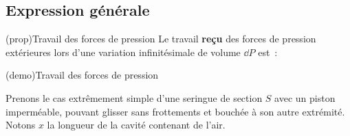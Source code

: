 \documentclass[../../main/main.tex]{subfiles}
\begin{document}
\subsection{Expression générale}

\begin{tcb*}(prop){Travail des forces de pression}
	Le travail \textbf{reçu} des forces de pression extérieures lors d'une
	variation infinitésimale de volume $\dd{P}$ est~:
	\psw{%
		\[
			\boxed{\delta W_p = -P\ind{ext}\dd{V}}
			\quad \Ra \quad
			W_p = - \int_{V_i}^{V_f}P\ind{ext}\dd{V}
		\]
	}%
\end{tcb*}
\begin{tcb*}[breakable](demo){Travail des forces de pression}
	\begin{isd}[righthand ratio=.4]
		Prenons le cas extrêmement simple d'une seringue de section $S$ avec un piston
		imperméable, pouvant glisser sans frottements et bouchée à son autre
		extrémité. Notons $x$ la longueur de la cavité contenant de l'air.
		\tcblower
		\begin{center}
		\end{center}

\end{isd}
\end{tcb*}
\end{document}
